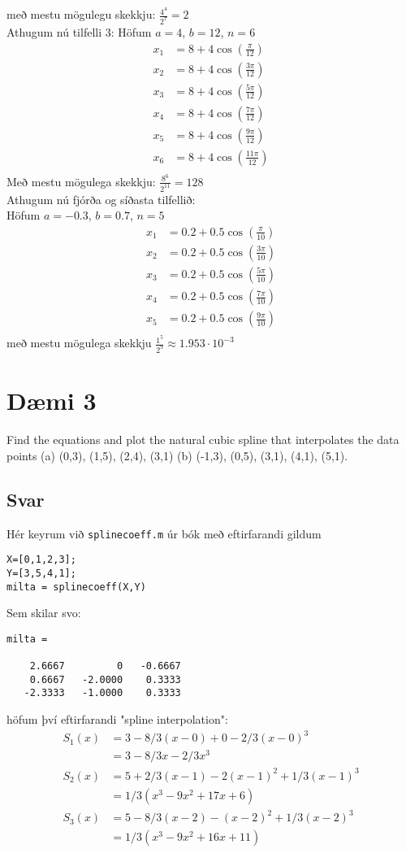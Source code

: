 \documentclass[11pt]{article}
\begin{document}
með mestu mögulegu skekkju: $\frac{4^4}{2^7} = 2$\\
Athugum nú tilfelli 3:
Höfum $a=4$, $b=12$, $n=6$
\begin{align*}
x_1 &= 8 +4\cos\left(\frac{\pi}{12}\right)\\
x_2 &= 8 +4\cos\left(\frac{3\pi}{12}\right)\\
x_3 &= 8 +4\cos\left(\frac{5\pi}{12}\right)\\
x_4 &= 8 +4\cos\left(\frac{7\pi}{12}\right)\\
x_5 &= 8 +4\cos\left(\frac{9\pi}{12}\right)\\
x_6 &= 8 +4\cos\left(\frac{11\pi}{12}\right)\\
\end{align*}
Með mestu mögulega skekkju: $\frac{8^6}{2^11} = 128$\\
Athugum nú fjórða og síðasta tilfellið:\\
Höfum $a=-0.3$, $b=0.7$, $n=5$
\begin{align*}
x_1 &= 0.2 + 0.5\cos\left(\frac{\pi}{10}\right)\\
x_2 &= 0.2 + 0.5\cos\left(\frac{3\pi}{10}\right)\\
x_3 &= 0.2 + 0.5\cos\left(\frac{5\pi}{10}\right)\\
x_4 &= 0.2 + 0.5\cos\left(\frac{7\pi}{10}\right)\\
x_5 &= 0.2 + 0.5\cos\left(\frac{9\pi}{10}\right)\\
\end{align*}
með mestu mögulega skekkju $\frac{1^5}{2^9} \approx 1.953\cdot 10^{-3}$


\section*{Dæmi 3}
Find the equations and plot the natural cubic spline that interpolates the data points (a) (0,3),
(1,5), (2,4), (3,1) (b) (-1,3), (0,5), (3,1), (4,1), (5,1).
\subsection*{Svar}
Hér keyrum við \texttt{splinecoeff.m} úr bók með eftirfarandi gildum
\begin{verbatim}
X=[0,1,2,3];
Y=[3,5,4,1];
milta = splinecoeff(X,Y)
\end{verbatim}
Sem skilar svo:
\begin{verbatim}
milta =

    2.6667         0   -0.6667
    0.6667   -2.0000    0.3333
   -2.3333   -1.0000    0.3333
\end{verbatim}
höfum því eftirfarandi "spline interpolation":
\begin{align*}
S_1(x) 	&= 3-8/3(x-0)+0-2/3(x-0)^3\\
		&= 3-8/3x-2/3x^3\\
S_2(x)	&= 5+2/3(x-1)-2(x-1)^2+1/3(x-1)^3\\
		&= 1/3(x^3-9x^2+17x+6)\\
S_3(x)	&= 5-8/3(x-2)-(x-2)^2+1/3(x-2)^3\\	
		&= 1/3(x^3-9x^2+16x+11)
\end{align*}
\end{document}
